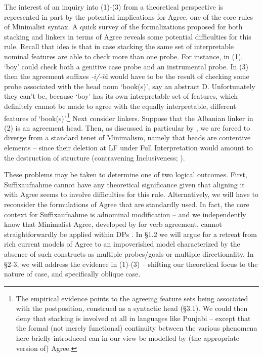 \documentclass[output=paper]{langsci/langscibook}
\begin{document}
The interest of an inquiry into (1)-(3) from a theoretical perspective is represented in part by the potential implications for Agree, one of the core rules of Minimalist syntax. A quick survey of the formalizations proposed for both stacking and linkers in terms of Agree reveals some potential difficulties for this rule. Recall that  idea is that in case stacking the same set of interpretable nominal features are able to check more than one probe. For instance, in (1), ‘boy’ could check both a genitive case probe and an instrumental probe. In (3) then the agreement suffixes \textit{{}-}\textit{i/-ĩã} would have to be the result of checking some probe associated with the head noun ‘book(s)’, say an abstract D. Unfortunately they can’t be, because ‘boy’ has its own interpretable set of features, which definitely cannot be made to agree with the equally interpretable, different features of ‘book(s)’.\footnote{The empirical evidence points to the agreeing feature sets being associated with the postposition, construed as a syntactic head (§3.1). We could then deny that stacking is involved at all in languages like Punjabi – except that the formal (not merely functional) continuity between the various phenomena here briefly introduced can in our view be modelled by (the appropriate version of) Agree.} Next consider linkers. Suppose that the Albanian linker in (2) is an agreement head. Then, as discussed in particular by \citet{Philip2012}, we are forced to diverge from a standard tenet of Minimalism, namely that heads are contentive elements – since their deletion at LF under Full Interpretation would amount to the destruction of structure (contravening Inclusiveness; \citealt{Chomsky1995}). 

These problems may be taken to determine one of two logical outcomes. First, Suffixaufnahme cannot have any theoretical significance given that aligning it with Agree seems to involve difficulties for this rule. Alternatively, we will have to reconsider the formulations of Agree that are standardly used. In fact, the core context for Suffixaufnahme is adnominal modification – and we independently know that Minimalist Agree, developed by \citet{Chomsky2000,Chomsky2001Derivation} for verb agreement, cannot straightforwardly be applied within DPs \citep{Carstens2001}. In §1.2 we will argue for a retreat from rich current models of Agree to an impoverished model characterized by the absence of such constructs as multiple probes\slash goals or multiple directionality. In §2-3, we will address the evidence in (1)-(3) – shifting our theoretical focus to the nature of case, and specifically oblique case.
\end{document}
